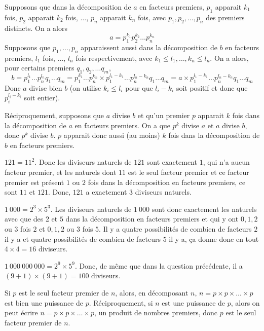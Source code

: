 \begin{sol}
Supposons que dans la décomposition de $a$ en facteurs premiers, $p_1$ apparait $k_1$ fois, $p_2$ apparait $k_2$ fois, $\dots$, $p_n$ apparait $k_n$ fois, avec $p_1, p_2, \dots, p_n$ des premiers distincts. On a alors
$$a = p_1^{k_1} p_2^{k_2} \dots p_n^{k_n}$$
Supposons que $p_1, \dots, p_n$ apparaissent aussi dans la décomposition de $b$ en facteurs premiers, $l_1$ fois, $\dots$, $l_n$ fois respectivement, avec $k_1 \le l_1, \dots, k_n \le l_n$. On a alors, pour certains premiers $q_1, q_2, \dots q_m$,
$$b = p_1^{l_1} \dots p_n^{l_n} q_1 \dots q_m = p_1^{k_1} \dots p_n^{k_n} \times p_1^{l_1 - k_1} \dots p_n^{l_n - k_n} q_1 \dots q_m = a \times p_1^{l_1 - k_1} \dots p_n^{l_n - k_n} q_1 \dots q_m$$
Donc $a$ divise bien $b$ (on utilise $k_i \le l_i$ pour que $l_i - k_i$ soit positif et donc que $p_i^{l_i - k_i}$ soit entier).

Réciproquement, supposons que $a$ divise $b$ et qu'un premier $p$ apparait $k$ fois dans la décomposition de $a$ en facteurs premiers. On a que $p^k$ divise $a$ et $a$ divise $b$, donc $p^k$ divise $b$. $p$ apparait donc aussi (au moins) $k$ fois dans la décomposition de $b$ en facteurs premiers.
\end{sol}


\begin{sol}
$121 = 11^2$. Donc les diviseurs naturels de $121$ sont exactement $1$, qui n'a aucun facteur premier, et les naturels dont $11$ est le seul facteur premier et ce facteur premier est présent $1$ ou $2$ fois dans la décomposition en facteurs premiers, ce sont $11$ et $121$. Donc, $121$ a exactement $3$ diviseurs naturels.

$1\ 000 = 2^3 \times 5^3$. Les diviseurs naturels de $1\ 000$ sont donc exactement les naturels avec que des $2$ et $5$ dans la décomposition en facteurs premiers et qui y ont $0, 1, 2$ ou $3$ fois $2$ et $0, 1, 2$ ou $3$ fois $5$. Il y a quatre possibilités de combien de facteurs $2$ il y a et quatre possibilités de combien de facteurs $5$ il y a, ça donne donc en tout $4 \times 4 = 16$ diviseurs.

$1\ 000\ 000\ 000 = 2^9 \times 5^9$. Donc, de même que dans la question précédente, il a $(9 + 1)\times (9 + 1) = 100$ diviseurs.
\end{sol}


\begin{sol}
Si $p$ est le seul facteur premier de $n$, alors, en décomposant $n$, $n = p \times p \times \dots \times p$ est bien une puissance de $p$. Réciproquement, si $n$ est une puissance de $p$, alors on peut écrire $n = p \times p \times \dots \times p$, un produit de nombres premiers, donc $p$ est le seul facteur premier de $n$.
\end{sol}


